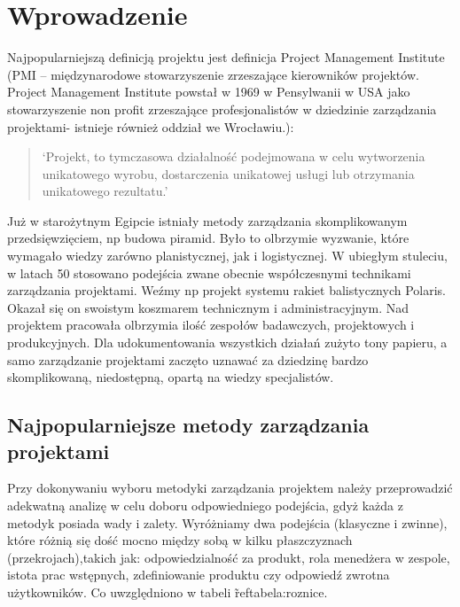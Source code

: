
\chapter{Wprowadzenie}

Najpopularniejszą definicją projektu jest definicja Project Management Institute (PMI – międzynarodowe stowarzyszenie zrzeszające kierowników projektów.
Project Management Institute powstał w 1969 w Pensylwanii w USA jako stowarzyszenie non profit zrzeszające profesjonalistów
w dziedzinie zarządzania projektami- istnieje również oddział we Wrocławiu.): 
\begin{quote}
`Projekt, to tymczasowa działalność podejmowana w celu wytworzenia unikatowego wyrobu,
dostarczenia unikatowej usługi lub otrzymania unikatowego rezultatu.'
~\cite{PMI_2000}
\end{quote}
Już w starożytnym Egipcie istniały metody zarządzania skomplikowanym przedsięwzięciem,
np budowa piramid. Było to olbrzymie wyzwanie, które wymagało wiedzy zarówno planistycznej,
jak i logistycznej. W ubiegłym stuleciu, w latach 50 stosowano podejścia zwane obecnie współczesnymi
technikami zarządzania projektami. Weźmy np projekt systemu rakiet balistycznych Polaris.
Okazał się on swoistym koszmarem technicznym i administracyjnym. Nad projektem pracowała olbrzymia ilość zespołów badawczych,
projektowych i produkcyjnych. Dla udokumentowania wszystkich działań zużyto tony papieru, a samo zarządzanie projektami zaczęto
uznawać za dziedzinę bardzo skomplikowaną, niedostępną, opartą na wiedzy specjalistów.\cite{Stanley_2013}

\section{Najpopularniejsze metody zarządzania projektami}
Przy dokonywaniu wyboru metodyki zarządzania projektem należy przeprowadzić adekwatną analizę w celu doboru odpowiedniego podejścia,
gdyż każda z metodyk posiada wady i zalety. Wyróżniamy dwa podejścia (klasyczne i zwinne), które różnią się dość mocno między sobą w kilku płaszczyznach (przekrojach),takich jak:
odpowiedzialność za produkt, rola menedżera w zespole, istota prac wstępnych, zdefiniowanie produktu czy odpowiedź zwrotna użytkowników.
Co uwzględniono w tabeli \~ref{tabela:roznice}.

